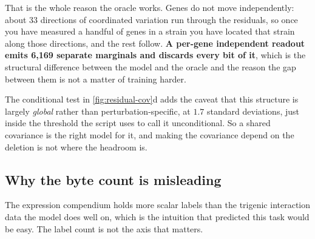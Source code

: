 That is the whole reason the oracle works. Genes do not move independently: about 33
directions of coordinated variation run through the residuals, so once you have measured a
handful of genes in a strain you have located that strain along those directions, and the
rest follow. \textbf{A per-gene independent readout emits 6,169 separate marginals and
discards every bit of it}, which is the structural difference between the model and the
oracle and the reason the gap between them is not a matter of training harder.

The conditional test in \cref{fig:residual-cov}d adds the caveat that this structure is
largely \emph{global} rather than perturbation-specific, at $1.7$ standard deviations, just
inside the threshold the script uses to call it unconditional. So a shared covariance is the
right model for it, and making the covariance depend on the deletion is not where the
headroom is.

\subsection{Why the byte count is misleading}

The expression compendium holds more scalar labels than the trigenic interaction data the
model does well on, which is the intuition that predicted this task would be easy. The
label count is not the axis that matters.

